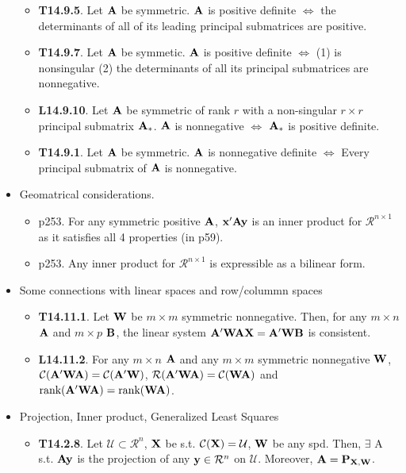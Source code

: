 \documentclass[a4paper, oneside]{book}
\begin{document}
\begin{itemize}
	\begin{itemize}
	\item \textbf{T14.9.5}. Let $\mathbf{A}$ be symmetric. $\mathbf A$ is positive definite $\iff$ the determinants of all of its leading principal submatrices are positive.
	\item \textbf{T14.9.7}. Let $\mathbf{A}$ be symmetic.  $\mathbf A$ is positive definite $\iff$ (1) is nonsingular (2) the determinants of all its principal submatrices are nonnegative.
	\item \textbf{L14.9.10}. Let $\mathbf{A}$ be symmetric of rank $r$ with a non-singular $r\times r$ principal submatrix $\mathbf{A}_*$. $\mathbf{A}$ is nonnegative $\iff$ $\mathbf{A}_*$ is positive definite.
	\item \textbf{T14.9.1}. Let $\mathbf{A}$ be symmetric. $\mathbf{A}$ is nonnegative definite $\iff$ Every principal submatrix of $\mathbf{A}$ is nonnegative.
	\end{itemize}
\item Geomatrical considerations.
	\begin{itemize}
	\item p253. For any symmetric positive $\mathbf{A}$, $\mathbf{x'Ay}$ is an inner product for $\mathcal{R}^{n\times 1}$ as it satisfies all 4 properties (in p59).
	\item p253. Any inner product for $\mathcal{R}^{n\times 1}$ is expressible as a bilinear form.
	\end{itemize}
\item Some connections with linear spaces and row/colummn spaces
	\begin{itemize}
	\item \textbf{T14.11.1}. Let $\mathbf{W}$ be $m\times m$ symmetric nonnegative. Then, for any $m\times n$ $\mathbf{A}$ and $m\times p$ $\mathbf{B}$, the linear system $\mathbf{A'WAX=A'WB}$ is consistent.
	\item \textbf{L14.11.2}. For any $m\times n$ $\mathbf{A}$ and any $m\times m$ symmetric nonnegative $\mathbf{W}$, $\mathcal{C}(\mathbf{A'WA})=\mathcal{C}(\mathbf{A'W})$, $\mathcal{R}(\mathbf{A'WA})=\mathcal{C}(\mathbf{WA})$ and $\text{rank}(\mathbf{A'WA})=\text{rank}(\mathbf{WA})$.
  	\end{itemize}
\item Projection, Inner product, Generalized Least Squares
	\begin{itemize}
	\item \textbf{T14.2.8}. Let $\mathcal{U}\subset \mathcal{R}^n$, $\mathbf{X}$ be s.t. $\mathcal{C}(\mathbf{X})=\mathcal{U}$, $\mathbf{W}$ be any spd. Then, $\exists$ A s.t. $\mathbf{Ay}$ is the projection of any $\mathbf{y}\in\mathcal{R}^n$ on $\mathcal{U}$. Moreover, $\mathbf{A}=\mathbf{P_{X,W}}$. 

\end{itemize}
\end{itemize}
\end{document}
